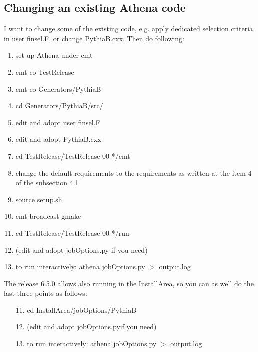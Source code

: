 \subsection{Changing an existing Athena code}
I want to change some of the existing code, e.g. apply dedicated
selection criteria in user$\_$finsel.F, or change PythiaB.cxx.
Then do following: \\

\begin{enumerate}
\vspace{-3mm}\item set up Athena under cmt
\vspace{-3mm}\item cmt co TestRelease
\vspace{-3mm}\item cmt co Generators/PythiaB
\vspace{-3mm}\item cd Generators/PythiaB/src/
\vspace{-3mm}\item edit and adopt user$\_$finsel.F
\vspace{-3mm}\item edit and adopt PythiaB.cxx
\vspace{-3mm}\item cd TestRelease/TestRelease-00-*/cmt
\vspace{-3mm}\item change the default requirements to the
requirements as written at the item 4 of the  subsection 4.1
\vspace{-3mm}\item source setup.sh
\vspace{-3mm}\item cmt broadcast gmake
\vspace{-3mm}\item cd TestRelease/TestRelease-00-*/run
\vspace{-3mm}\item (edit and adopt jobOptions.py if you need)
\vspace{-3mm}\item to run interactively: athena jobOptions.py $>$
output.log
 \end{enumerate}
 
 The release 6.5.0 allows also running in the InstallArea, 
 so you can as well do the last three points as follows:
 
 \begin{itemize}
 \vspace{-3mm}\item[11.] cd InstallArea/jobOptions/PythiaB 
\vspace{-3mm}\item[12.] (edit and adopt jobOptions.pyif you need)
\vspace{-3mm}\item[13.] to run interactively: athena jobOptions.py $>$
output.log
 \end{itemize}
 


